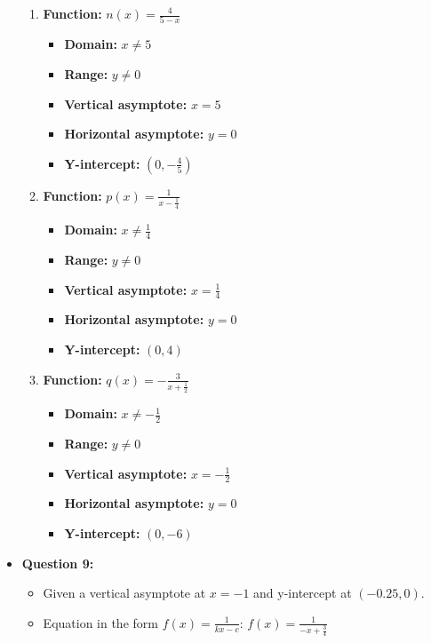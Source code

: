 \documentclass{article}
\begin{document}
\begin{itemize}
\begin{enumerate}[label=\alph*)]
        \item \textbf{Function:} $n(x) = \frac{4}{5-x}$
            \begin{itemize}
                \item \textbf{Domain:} $x \neq 5$
                \item \textbf{Range:} $y \neq 0$
                \item \textbf{Vertical asymptote:} $x = 5$
                \item \textbf{Horizontal asymptote:} $y = 0$
                \item \textbf{Y-intercept:} $(0, -\frac{4}{5})$
            \end{itemize}
        
        \item \textbf{Function:} $p(x) = \frac{1}{x-\frac{1}{4}}$
            \begin{itemize}
                \item \textbf{Domain:} $x \neq \frac{1}{4}$
                \item \textbf{Range:} $y \neq 0$
                \item \textbf{Vertical asymptote:} $x = \frac{1}{4}$
                \item \textbf{Horizontal asymptote:} $y = 0$
                \item \textbf{Y-intercept:} $(0, 4)$
            \end{itemize}
        
        \item \textbf{Function:} $q(x) = -\frac{3}{x+\frac{1}{2}}$
            \begin{itemize}
                \item \textbf{Domain:} $x \neq -\frac{1}{2}$
                \item \textbf{Range:} $y \neq 0$
                \item \textbf{Vertical asymptote:} $x = -\frac{1}{2}$
                \item \textbf{Horizontal asymptote:} $y = 0$
                \item \textbf{Y-intercept:} $(0, -6)$
            \end{itemize}
    \end{enumerate}
    
    \item \textbf{Question 9:}
    \begin{itemize}
        \item Given a vertical asymptote at $x = -1$ and y-intercept at $(-0.25, 0)$.
        \item Equation in the form $f(x) = \frac{1}{kx-c}$: $f(x) = \frac{1}{-x + \frac{3}{4}}$
    \end{itemize}
    

\end{itemize}
\end{document}
